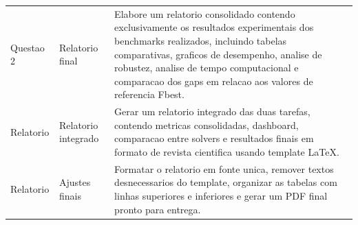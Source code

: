 \documentclass[12pt,a4paper]{article}
\begin{document}
\begin{longtable}{p{2.2cm}p{3.8cm}p{8.6cm}}
Questao 2 & Relatorio final &
Elabore um relatorio consolidado contendo exclusivamente os resultados experimentais dos benchmarks realizados, incluindo tabelas comparativas, graficos de desempenho, analise de robustez, analise de tempo computacional e comparacao dos gaps em relacao aos valores de referencia Fbest. \\

Relatorio & Relatorio integrado &
Gerar um relatorio integrado das duas tarefas, contendo metricas consolidadas, dashboard, comparacao entre solvers e resultados finais em formato de revista cientifica usando template LaTeX. \\

Relatorio & Ajustes finais &
Formatar o relatorio em fonte unica, remover textos desnecessarios do template, organizar as tabelas com linhas superiores e inferiores e gerar um PDF final pronto para entrega. \\

\end{longtable}
\end{document}
